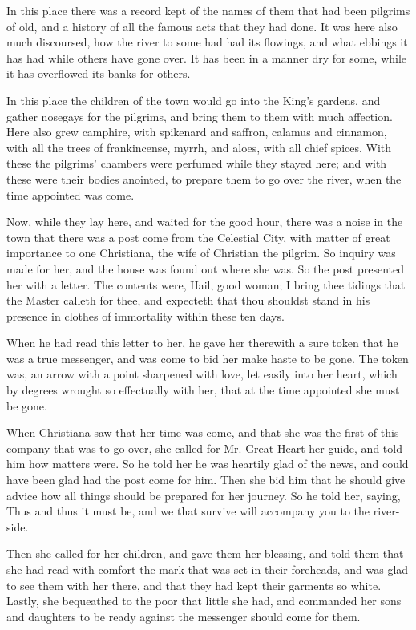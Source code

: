 In this place there was a record kept of the names of them that had been pilgrims of old, and a history of all the famous acts that they had done. It was here also much discoursed, how the river to some had had its flowings, and what ebbings it has had while others have gone over. It has been in a manner dry for some, while it has overflowed its banks for others.

In this place the children of the town would go into the King's gardens, and gather nosegays for the pilgrims, and bring them to them with much affection. Here also grew camphire, with spikenard and saffron, calamus and cinnamon, with all the trees of frankincense, myrrh, and aloes, with all chief spices. With these the pilgrims' chambers were perfumed while they stayed here; and with these were their bodies anointed, to prepare them to go over the river, when the time appointed was come.

Now, while they lay here, and waited for the good hour, there was a noise in the town that there was a post come from the Celestial City, with matter of great importance to one Christiana, the wife of Christian the pilgrim. So inquiry was made for her, and the house was found out where she was. So the post presented her with a letter. The contents were, Hail, good woman; I bring thee tidings that the Master calleth for thee, and expecteth that thou shouldst stand in his presence in clothes of immortality within these ten days.

When he had read this letter to her, he gave her therewith a sure token that he was a true messenger, and was come to bid her make haste to be gone. The token was, an arrow with a point sharpened with love, let easily into her heart, which by degrees wrought so effectually with her, that at the time appointed she must be gone.

When Christiana saw that her time was come, and that she was the first of this company that was to go over, she called for Mr. Great-Heart her guide, and told him how matters were. So he told her he was heartily glad of the news, and could have been glad had the post come for him. Then she bid him that he should give advice how all things should be prepared for her journey. So he told her, saying, Thus and thus it must be, and we that survive will accompany you to the river-side.

Then she called for her children, and gave them her blessing, and told them that she had read with comfort the mark that was set in their foreheads, and was glad to see them with her there, and that they had kept their garments so white. Lastly, she bequeathed to the poor that little she had, and commanded her sons and daughters to be ready against the messenger should come for them.


